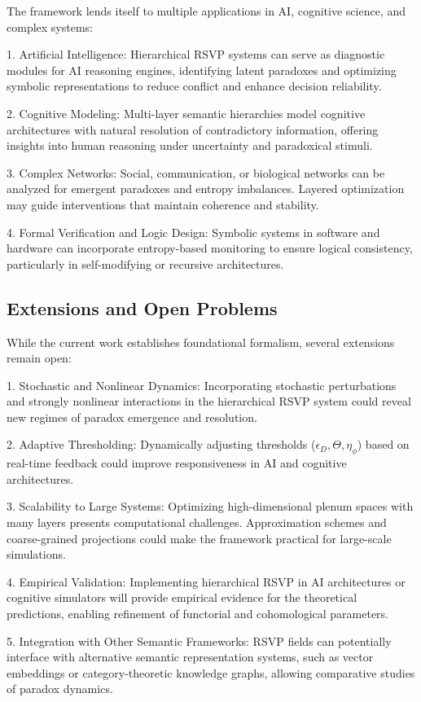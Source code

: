\documentclass[12pt]{article}
\theoremstyle{plain}
\begin{document}
The framework lends itself to multiple applications in AI, cognitive science, and complex systems:

1. Artificial Intelligence: Hierarchical RSVP systems can serve as diagnostic modules for AI reasoning engines, identifying latent paradoxes and optimizing symbolic representations to reduce conflict and enhance decision reliability.

2. Cognitive Modeling: Multi-layer semantic hierarchies model cognitive architectures with natural resolution of contradictory information, offering insights into human reasoning under uncertainty and paradoxical stimuli.

3. Complex Networks: Social, communication, or biological networks can be analyzed for emergent paradoxes and entropy imbalances. Layered optimization may guide interventions that maintain coherence and stability.

4. Formal Verification and Logic Design: Symbolic systems in software and hardware can incorporate entropy-based monitoring to ensure logical consistency, particularly in self-modifying or recursive architectures.

\subsection{Extensions and Open Problems}

While the current work establishes foundational formalism, several extensions remain open:

1. Stochastic and Nonlinear Dynamics: Incorporating stochastic perturbations and strongly nonlinear interactions in the hierarchical RSVP system could reveal new regimes of paradox emergence and resolution.

2. Adaptive Thresholding: Dynamically adjusting thresholds (\(\epsilon_D, \Theta, \eta_\phi\)) based on real-time feedback could improve responsiveness in AI and cognitive architectures.

3. Scalability to Large Systems: Optimizing high-dimensional plenum spaces with many layers presents computational challenges. Approximation schemes and coarse-grained projections could make the framework practical for large-scale simulations.

4. Empirical Validation: Implementing hierarchical RSVP in AI architectures or cognitive simulators will provide empirical evidence for the theoretical predictions, enabling refinement of functorial and cohomological parameters.

5. Integration with Other Semantic Frameworks: RSVP fields can potentially interface with alternative semantic representation systems, such as vector embeddings or category-theoretic knowledge graphs, allowing comparative studies of paradox dynamics.
\end{document}
